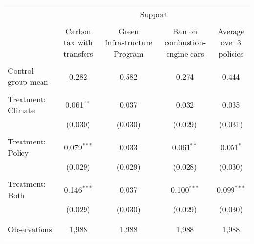 
\begin{tabular}{@{\extracolsep{5pt}}lcccc} 
\\[-1.8ex]\hline 
\hline \\[-1.8ex] 
 & \multicolumn{4}{c}{Support} \\ 
\cline{2-5} 
\\[-1.8ex] & Carbon tax with transfers & Green Infrastructure Program & Ban on combustion-engine cars & Average over 3 policies \\ 
\hline \\[-1.8ex] 
 Control group mean & 0.282 & 0.582 & 0.274 & 0.444  \\ \hline \\[-1.8ex] Treatment: Climate & 0.061$^{**}$ & 0.037 & 0.032 & 0.035 \\ 
  & (0.030) & (0.030) & (0.029) & (0.031) \\ 
  & & & & \\ 
 Treatment: Policy & 0.079$^{***}$ & 0.033 & 0.061$^{**}$ & 0.051$^{*}$ \\ 
  & (0.029) & (0.029) & (0.028) & (0.030) \\ 
  & & & & \\ 
 Treatment: Both & 0.146$^{***}$ & 0.037 & 0.100$^{***}$ & 0.099$^{***}$ \\ 
  & (0.029) & (0.030) & (0.029) & (0.030) \\ 
  & & & & \\ 
\hline \\[-1.8ex] 

Observations & 1,988 & 1,988 & 1,988 & 1,988 \\ 
\hline 
\hline \\[-1.8ex] 
\end{tabular} 